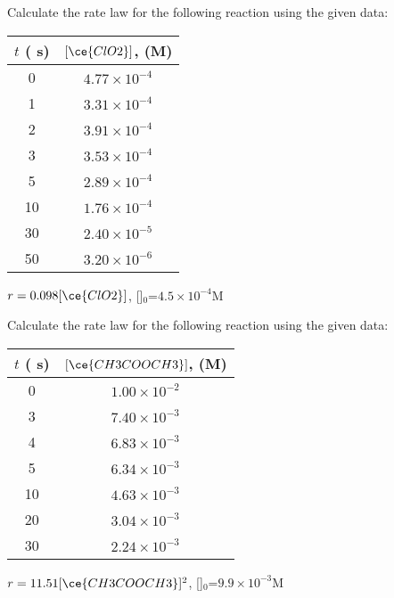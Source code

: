 \documentclass[main.tex]{subfiles}
\begin{document}
\begin{multicols*}{2}
\begin{question}[ID=\the\value{numA}]
Calculate the rate law for the following reaction using the given data:
\begin{center}\begin{tabular}[t]{   c  c   }
\toprule
  $t$ ( s)	&$[\ce{ClO2}]$, (M) \\
\midrule
0&	$4.77\times10^{-4}$\\	
1&	$3.31\times10^{-4}$\\
2&	$3.91\times10^{-4}$\\
3&	$3.53\times10^{-4}$\\
5&	$2.89\times10^{-4}$\\
10&	$1.76\times10^{-4}$\\
30&	$2.40\times10^{-5}$\\
50&	$3.20\times10^{-6}$\\
\bottomrule
\end{tabular}\end{center}
\end{question}
\begin{solution}
 $r=0.098[\ce{ClO2}]$, []$_0$=$4.5\times 10^{-4}$M
\hspace{0.1cm}\end{solution}%


\begin{question}[ID=\the\value{numA}]
Calculate the rate law for the following reaction using the given data: 
\begin{center}\begin{tabular}[t]{   c  c   }
\toprule
  $t$ ( s)	&$[\ce{CH3COOCH3}]$, (M) \\
\midrule
	0	&$1.00\times10^{-2}$\\
	3	&$7.40\times10^{-3}$\\
	4	&$6.83\times10^{-3}$\\
	5	&$6.34\times10^{-3}$\\
	10	&$4.63\times10^{-3}$\\
	20	&$3.04\times10^{-3}$\\
	30&$2.24\times10^{-3}$\\
\bottomrule
\end{tabular}\end{center}
\end{question}
\begin{solution}
 $r=11.51[\ce{CH3COOCH3}]^2$, []$_0$=$9.9\times 10^{-3}$M
\hspace{0.1cm}\end{solution}%



\end{multicols*}
\end{document}
